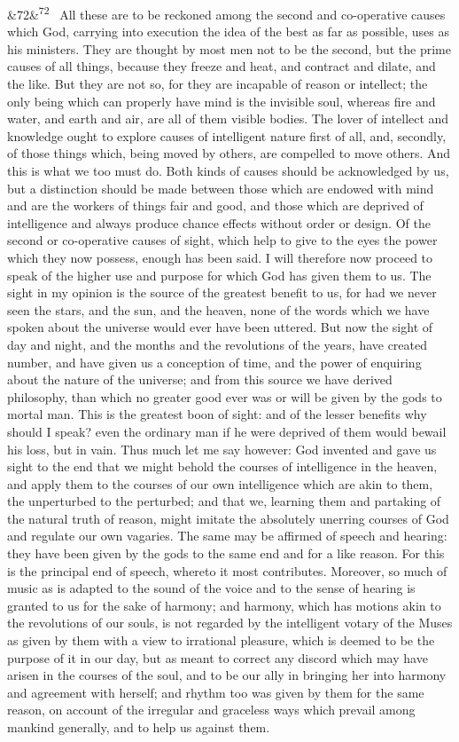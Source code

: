 \documentclass[12pt]{article}
\newcommand{\para}[1][]{\par\noindent\ifx&#1&\else\textsuperscript{\footnotesize #1}~\fi}
\begin{document}
\para[72] All these are to be reckoned among the second and co-operative causes which God, carrying into execution the idea of the best as far as possible, uses as his ministers. They are thought by most men not to be the second, but the prime causes of all things, because they freeze and heat, and contract and dilate, and the like. But they are not so, for they are incapable of reason or intellect; the only being which can properly have mind is the invisible soul, whereas fire and water, and earth and air, are all of them visible bodies. The lover of intellect and knowledge ought to explore causes of intelligent nature first of all, and, secondly, of those things which, being moved by others, are compelled to move others. And this is what we too must do. Both kinds of causes should be acknowledged by us, but a distinction should be made between those which are endowed with mind and are the workers of things fair and good, and those which are deprived of intelligence and always produce chance effects without order or design. Of the second or co-operative causes of sight, which help to give to the eyes the power which they now possess, enough has been said. I will therefore now proceed to speak of the higher use and purpose for which God has given them to us. The sight in my opinion is the source of the greatest benefit to us, for had we never seen the stars, and the sun, and the heaven, none of the words which we have spoken about the universe would ever have been uttered. But now the sight of day and night, and the months and the revolutions of the years, have created number, and have given us a conception of time, and the power of enquiring about the nature of the universe; and from this source we have derived philosophy, than which no greater good ever was or will be given by the gods to mortal man. This is the greatest boon of sight: and of the lesser benefits why should I speak? even the ordinary man if he were deprived of them would bewail his loss, but in vain. Thus much let me say however: God invented and gave us sight to the end that we might behold the courses of intelligence in the heaven, and apply them to the courses of our own intelligence which are akin to them, the unperturbed to the perturbed; and that we, learning them and partaking of the natural truth of reason, might imitate the absolutely unerring courses of God and regulate our own vagaries. The same may be affirmed of speech and hearing: they have been given by the gods to the same end and for a like reason. For this is the principal end of speech, whereto it most contributes. Moreover, so much of music as is adapted to the sound of the voice and to the sense of hearing is granted to us for the sake of harmony; and harmony, which has motions akin to the revolutions of our souls, is not regarded by the intelligent votary of the Muses as given by them with a view to irrational pleasure, which is deemed to be the purpose of it in our day, but as meant to correct any discord which may have arisen in the courses of the soul, and to be our ally in bringing her into harmony and agreement with herself; and rhythm too was given by them for the same reason, on account of the irregular and graceless ways which prevail among mankind generally, and to help us against them.
\end{document}
